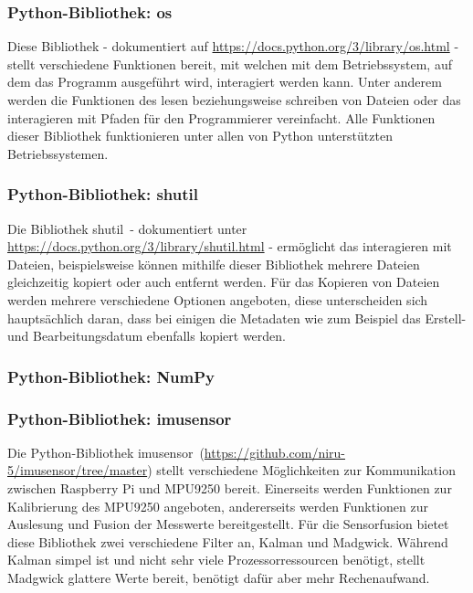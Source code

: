 \subsubsection{Python-Bibliothek: os}
\label{subsubsec:tLibOs}
Diese Bibliothek - dokumentiert auf \url{https://docs.python.org/3/library/os.html} - stellt verschiedene Funktionen bereit, mit welchen mit dem Betriebssystem, auf dem das Programm ausgeführt wird, interagiert werden kann. Unter anderem werden die Funktionen des lesen beziehungsweise schreiben von Dateien oder das interagieren mit Pfaden für den Programmierer vereinfacht. Alle Funktionen dieser Bibliothek funktionieren unter allen von Python unterstützten Betriebssystemen.

\subsubsection{Python-Bibliothek: shutil}
\label{subsubsec:tShutil}
Die Bibliothek \glqq shutil\grqq\ - dokumentiert unter \url{https://docs.python.org/3/library/shutil.html} - ermöglicht das interagieren mit Dateien, beispielsweise können mithilfe dieser Bibliothek mehrere Dateien gleichzeitig kopiert oder auch entfernt werden. Für das Kopieren von Dateien werden mehrere verschiedene Optionen angeboten, diese unterscheiden sich hauptsächlich daran, dass bei einigen die Metadaten wie zum Beispiel das Erstell- und Bearbeitungsdatum ebenfalls kopiert werden.

\subsubsection{Python-Bibliothek: NumPy}
\label{subsubsec:tNumpy}


\subsubsection{Python-Bibliothek: imusensor}
\label{subsubsec:tLibImusensor}
Die Python-Bibliothek \glqq imusensor\grqq\ (\url{https://github.com/niru-5/imusensor/tree/master}) stellt verschiedene Möglichkeiten zur Kommunikation zwischen Raspberry Pi und MPU9250 bereit. Einerseits werden Funktionen zur Kalibrierung des MPU9250 angeboten, andererseits werden Funktionen zur Auslesung und Fusion der Messwerte bereitgestellt. Für die Sensorfusion bietet diese Bibliothek zwei verschiedene Filter an, Kalman und Madgwick. Während Kalman simpel ist und nicht sehr viele Prozessorressourcen benötigt, stellt Madgwick glattere Werte bereit, benötigt dafür aber mehr Rechenaufwand.


